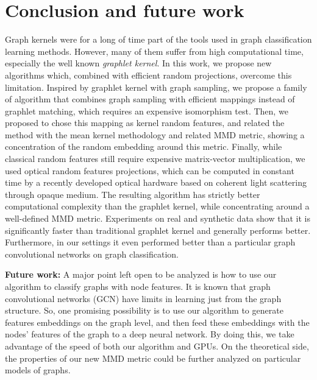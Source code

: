 \section{Conclusion and future work}
Graph kernels were for a long of time part of the tools used in graph classification learning methods. However, many of them suffer from high computational time, especially the well known \emph{graphlet kernel}. In this work, we propose  new algorithms which, combined with efficient random projections, overcome this limitation. Inspired by graphlet kernel with graph sampling, we propose a family of algorithm that combines graph sampling with efficient mappings instead of graphlet matching, which requires an expensive isomorphism test. Then, we proposed to chose this mapping as kernel random features, and related the method with the mean kernel methodology and related MMD metric, showing a concentration of the random embedding around this metric. Finally, while classical random features still require expensive matrix-vector multiplication, we used optical random features projections, which can be computed in constant time by a recently developed optical hardware based on coherent light scattering through opaque medium. The resulting algorithm has strictly better computational complexity than the graphlet kernel, while concentrating around a well-defined MMD metric. Experiments on real and synthetic data show that it is significantly faster than traditional graphlet kernel and generally performs better. Furthermore, in our settings it even performed better than a particular graph convolutional networks on graph classification.

\textbf{Future work:} A major point left open to be analyzed is how to use our algorithm to classify graphs with node features. It is known that graph convolutional networks (GCN) have limits in learning just from the graph structure. So, one promising possibility is to use our algorithm to generate features embeddings on the graph level, and then feed these embeddings with the nodes' features of the graph to a deep neural network. By doing this, we take advantage of the speed of both our algorithm and GPUs. On the theoretical side, the properties of our new MMD metric could be further analyzed on particular models of graphs.



